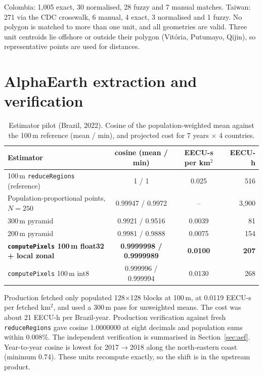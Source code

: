 \documentclass[11pt]{article}
\begin{document}
Colombia: 1{,}005 exact, 30 normalised, 28 fuzzy and 7 manual matches. Taiwan: 271 via the CDC crosswalk,
6 manual, 4 exact, 3 normalised and 1 fuzzy. No polygon is matched to more than one unit, and all geometries are
valid. Three unit centroids lie offshore or outside their polygon (Vit\'oria, Putumayo, Qijin), so
representative points are used for distances.

\section{AlphaEarth extraction and verification}
\label{app:aef}

\begin{table}[h]
\centering\small
\caption{Estimator pilot (Brazil, 2022). Cosine of the population-weighted mean against the 100\,m
reference (mean / min), and projected cost for 7 years $\times$ 4 countries.}
\begin{tabular}{lccr}
\toprule
Estimator & cosine (mean / min) & EECU-s per km$^2$ & EECU-h \\
\midrule
100\,m \texttt{reduceRegions} (reference) & 1 / 1 & 0.025 & 516 \\
Population-proportional points, $N=250$ & 0.99947 / 0.9972 & -- & 3{,}900 \\
300\,m pyramid & 0.9921 / 0.9516 & 0.0039 & 81 \\
200\,m pyramid & 0.9981 / 0.9888 & 0.0075 & 154 \\
\textbf{\texttt{computePixels} 100\,m float32 + local zonal} & \textbf{0.9999998 / 0.9999989} & \textbf{0.0100} & \textbf{207} \\
\texttt{computePixels} 100\,m int8 & 0.999996 / 0.999994 & 0.0130 & 268 \\
\bottomrule
\end{tabular}
\end{table}

Production fetched only populated 128$\times$128 blocks at 100\,m, at 0.0119 EECU-s per fetched km$^2$, and
used a 300\,m pass for unweighted means. The cost was about 21 EECU-h per Brazil-year. Production verification
against fresh \texttt{reduceRegions} gave cosine 1.0000000 at eight decimals and population sums within 0.008\%. The independent
verification is summarised in Section~\ref{sec:aef}. Year-to-year cosine is lowest for 2017$\to$2018
along the north-eastern coast (minimum 0.74). These units recompute exactly, so the shift is in the
upstream product.
\end{document}
